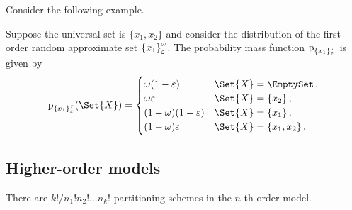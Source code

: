 \documentclass[10pt,final,hidelinks]{article}
\numberwithin{equation}{section}
\begin{document}





Consider the following example.
\begin{example}
	Suppose the universal set is $\{ x_1,x_2 \}$ and consider the distribution of the first-order random approximate set $\AT{\{x_1\}}[\fprate][\fnrate]$.
	The probability mass function $\Fun{p}_{\AT{\{x_1\}}[\fprate][\fnrate]}$ is given by
	\begin{equation}
	\Fun{p}_{\AT{\{x_1\}}[\fprate][\tprate]}(\Set{X}) =
	\begin{cases} 
	\fnrate (1-\fprate) & \Set{X} = \EmptySet\,,\\
	\fnrate \fprate     & \Set{X} = \{x_2\}\,,\\
	(1-\fnrate)(1-\fprate)     & \Set{X} = \{x_1\}\,,\\
	(1-\fnrate)\fprate         & \Set{X} = \{x_1,x_2\}\,.
	\end{cases}
	\end{equation}
\end{example}


\subsection{Higher-order models}
There are $k! / n_1! n_2! \ldots n_k!$ partitioning schemes in the $n$-th order model.
\end{document}
